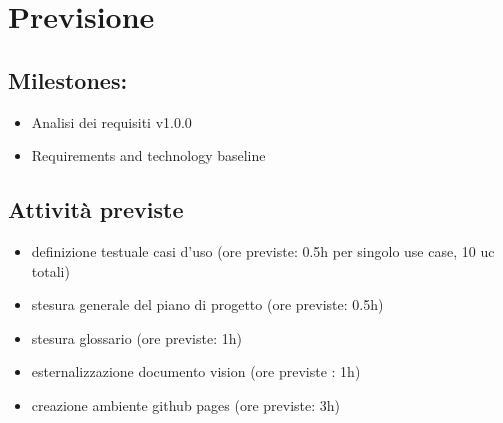 \section{Previsione}

\subsection{Milestones:}

\begin{itemize}
    \item Analisi dei requisiti v1.0.0
    \item Requirements and technology baseline
\end{itemize}

\subsection{Attività previste}

\begin{itemize}
    \item definizione testuale casi d'uso (ore previste: 0.5h per singolo use case, 10 uc totali)
    \item stesura generale del piano di progetto (ore previste: 0.5h)
    \item stesura glossario (ore previste: 1h)
    \item esternalizzazione documento vision (ore previste : 1h)
    \item creazione ambiente github pages (ore previste: 3h)
\end{itemize}

